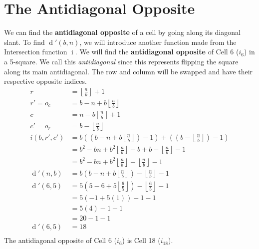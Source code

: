 \documentclass[twoside,openany,12pt]{book}
\begin{document}
    \section{The Antidiagonal Opposite}
    We can find the \textbf{antidiagonal opposite} of a cell by going along its diagonal slant. To find $\operatorname{d}'(b,n)$, we will introduce another function made from the Intersection function $\operatorname{i}$. We will find the \textbf{antidiagonal opposite} of Cell 6 ($i_{6}$) in a 5-square. We call this \textit{antidiagonal} since this represents flipping the square along its main antidiagonal. The row and column will be swapped and have their respective opposite indices. 
    \begin{equation}
      \begin{split}
        r &= \left\lfloor \frac{n}{b} \right\rfloor + 1 \\
        r' = o_c &= b - n + b\left\lfloor \frac{n}{b} \right\rfloor \\
        c &= n - b\left\lfloor \frac{n}{b} \right\rfloor + 1 \\
        c' = o_r &= b - \left\lfloor \frac{n}{b} \right\rfloor \\
        i(b,r',c') &= b((b - n + b\left\lfloor \frac{n}{b} \right\rfloor) - 1)+((b - \left\lfloor \frac{n}{b} \right\rfloor) -1) \\
            &= b^2 - bn + b^2\left\lfloor \frac{n}{b} \right\rfloor - b + b - \left\lfloor \frac{n}{b} \right\rfloor -1 \\
            &= b^2 - bn + b^2\left\lfloor \frac{n}{b} \right\rfloor - \left\lfloor \frac{n}{b} \right\rfloor -1 \\
        \operatorname{d}'(n,b) &= b(b - n + b\left\lfloor \frac{n}{b} \right\rfloor) - \left\lfloor \frac{n}{b} \right\rfloor -1 \\
        \operatorname{d}'(6,5) &= 5(5 - 6 + 5\left\lfloor \frac{6}{5} \right\rfloor) - \left\lfloor \frac{6}{5} \right\rfloor -1 \\
                               &= 5(-1 + 5(1)) - 1 - 1 \\
                               &= 5(4) - 1 - 1\\
                               &= 20 - 1 - 1\\
        \operatorname{d}'(6,5) &= 18\\
      \end{split} 
    \end{equation}
    The antidiagonal opposite of Cell 6 ($i_{6}$) is Cell 18 ($i_{18}$).
\end{document}
